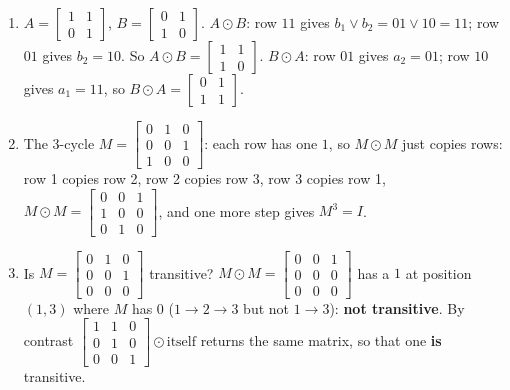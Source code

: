 \documentclass{fkt-notes}
\theoremstyle{definition}
\begin{document}
\begin{example}
  \begin{enumerate}[label=(\alph*),nosep]
    \item $A=\begin{bmatrix}1&1\\0&1\end{bmatrix}$,
          $B=\begin{bmatrix}0&1\\1&0\end{bmatrix}$.
          $A\odot B$: row $11$ gives $b_1\vee b_2=01\vee10=11$; row $01$
          gives $b_2=10$. So $A\odot B=\begin{bmatrix}1&1\\1&0\end{bmatrix}$.
          $B\odot A$: row $01$ gives $a_2=01$; row $10$ gives $a_1=11$, so
          $B\odot A=\begin{bmatrix}0&1\\1&1\end{bmatrix}$.
    \item The 3-cycle $M=\begin{bmatrix}0&1&0\\0&0&1\\1&0&0\end{bmatrix}$:
          each row has one $1$, so $M\odot M$ just copies rows:
          row 1 copies row 2, row 2 copies row 3, row 3 copies row 1,
          $M\odot M=\begin{bmatrix}0&0&1\\1&0&0\\0&1&0\end{bmatrix}$, and
          one more step gives $M^{3}=I$.
    \item Is $M=\begin{bmatrix}0&1&0\\0&0&1\\0&0&0\end{bmatrix}$
          transitive? $M\odot M=\begin{bmatrix}0&0&1\\0&0&0\\0&0&0\end{bmatrix}$
          has a $1$ at position $(1,3)$ where $M$ has $0$ ($1\to2\to3$ but
          not $1\to3$): \textbf{not transitive}. By contrast
          $\begin{bmatrix}1&1&0\\0&1&0\\0&0&1\end{bmatrix}\odot\text{itself}$
          returns the same matrix, so that one \textbf{is} transitive.
  \end{enumerate}
\end{example}
\end{document}
